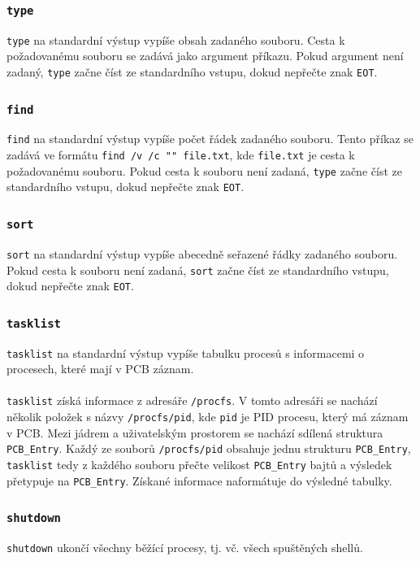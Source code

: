 \documentclass[12pt, a4paper]{article}
\begin{document}
    \subsubsection*{\texttt{type}}
    \texttt{type} na standardní výstup vypíše obsah zadaného souboru. Cesta k požadovanému souboru se zadává jako argument příkazu. Pokud argument není zadaný, \texttt{type} začne číst ze standardního vstupu, dokud nepřečte znak \texttt{EOT}.
    
    \subsubsection*{\texttt{find}}
    \texttt{find} na standardní výstup vypíše počet řádek zadaného souboru. Tento příkaz se zadává ve formátu \texttt{find /v /c "{}"{} file.txt}, kde \texttt{file.txt} je cesta k požadovanému souboru. Pokud cesta k souboru není zadaná, \texttt{type} začne číst ze standardního vstupu, dokud nepřečte znak \texttt{EOT}.
    
    \subsubsection*{\texttt{sort}}
    \texttt{sort} na standardní výstup vypíše abecedně seřazené řádky zadaného souboru. Pokud cesta k souboru není zadaná, \texttt{sort} začne číst ze standardního vstupu, dokud nepřečte znak \texttt{EOT}.
    
    \subsubsection*{\texttt{tasklist}}
    \texttt{tasklist} na standardní výstup vypíše tabulku procesů s informacemi o procesech, které mají v PCB záznam. 
    \\
    \\
	\texttt{tasklist} získá informace z adresáře \texttt{/procfs}. V tomto adresáři se nachází několik položek s názvy \texttt{/procfs/pid}, kde \texttt{pid} je PID procesu, který má záznam v PCB. Mezi jádrem a uživatelským prostorem se nachází sdílená struktura \texttt{PCB\_Entry}. Každý ze souborů \texttt{/procfs/pid} obsahuje jednu strukturu \texttt{PCB\_Entry}, \texttt{tasklist} tedy z každého souboru přečte velikost \texttt{PCB\_Entry} bajtů a výsledek přetypuje na \texttt{PCB\_Entry}. Získané informace naformátuje do výsledné tabulky.
    
    
    \subsubsection*{\texttt{shutdown}}
    \texttt{shutdown} ukončí všechny běžící procesy, tj. vč. všech spuštěných shellů.
    
\end{document}
